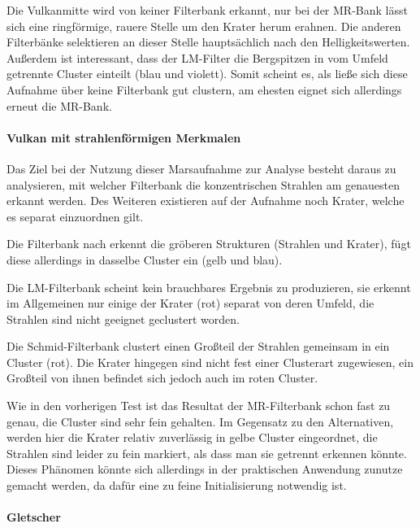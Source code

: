 Die Vulkanmitte wird von keiner Filterbank erkannt, nur bei der MR-Bank lässt sich eine ringförmige, rauere Stelle um den Krater herum erahnen. Die anderen Filterbänke selektieren an dieser Stelle hauptsächlich nach den Helligkeitswerten. Außerdem ist interessant, dass der LM-Filter die Bergspitzen in vom Umfeld getrennte Cluster einteilt (blau und violett). Somit scheint es, als ließe sich diese Aufnahme über keine Filterbank gut clustern, am ehesten eignet sich allerdings erneut die MR-Bank.

\paragraph{Vulkan mit strahlenförmigen Merkmalen}

Das Ziel bei der Nutzung dieser Marsaufnahme zur Analyse besteht daraus zu analysieren, mit welcher Filterbank die konzentrischen Strahlen am genauesten erkannt werden. Des Weiteren existieren auf der Aufnahme noch Krater, welche es separat einzuordnen gilt.

Die Filterbank nach \cite{jain_91} erkennt die gröberen Strukturen (Strahlen und Krater), fügt diese allerdings in dasselbe Cluster ein (gelb und blau).

Die LM-Filterbank scheint kein brauchbares Ergebnis zu produzieren, sie erkennt im Allgemeinen nur einige der Krater (rot) separat von deren Umfeld, die Strahlen sind nicht geeignet geclustert worden.

Die Schmid-Filterbank clustert einen Großteil der Strahlen gemeinsam in ein Cluster (rot). Die Krater hingegen sind nicht fest einer Clusterart zugewiesen, ein Großteil von ihnen befindet sich jedoch auch im roten Cluster.

Wie in den vorherigen Test ist das Resultat der MR-Filterbank schon fast zu genau, die Cluster sind sehr fein gehalten. Im Gegensatz zu den Alternativen, werden hier die Krater relativ zuverlässig in gelbe Cluster eingeordnet, die Strahlen sind leider zu fein markiert, als dass man sie getrennt erkennen könnte. Dieses Phänomen könnte sich allerdings in der praktischen Anwendung zunutze gemacht werden, da dafür eine zu feine Initialisierung notwendig ist.

\paragraph{Gletscher}


